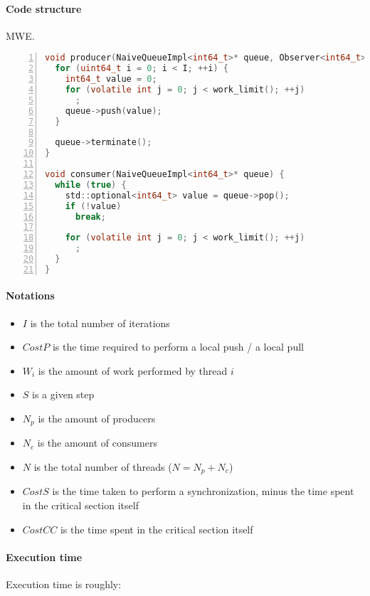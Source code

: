 \documentclass[a4paper,11pt]{article}
\begin{document}

\paragraph{Code structure} MWE.

\begin{lstlisting}[language=c,numbers=left,tabsize=2]
void producer(NaiveQueueImpl<int64_t>* queue, Observer<int64_t>* observer) {
  for (uint64_t i = 0; i < I; ++i) {
    int64_t value = 0;
    for (volatile int j = 0; j < work_limit(); ++j)
      ;
    queue->push(value);
  }

  queue->terminate();
}

void consumer(NaiveQueueImpl<int64_t>* queue) {
  while (true) {
    std::optional<int64_t> value = queue->pop();
    if (!value)
      break;

    for (volatile int j = 0; j < work_limit(); ++j)
      ;
  }
}
\end{lstlisting}

\paragraph{Notations}

\begin{itemize}
    \item $ I $ is the total number of iterations
    \item $ CostP $ is the time required to perform a local push / a local pull
    \item $ W_i $ is the amount of work performed by thread $ i $
    \item $ S $ is a given step
    \item $ N_p $ is the amount of producers
    \item $ N_c $ is the amount of consumers
    \item $ N $ is the total number of threads ($ N = N_p + N_c $)
    \item $ CostS $ is the time taken to perform a synchronization, minus the time spent in the critical section itself
    \item $ CostCC $ is the time spent in the critical section itself
\end{itemize}

\paragraph{Execution time}
Execution time is roughly:
\end{document}
